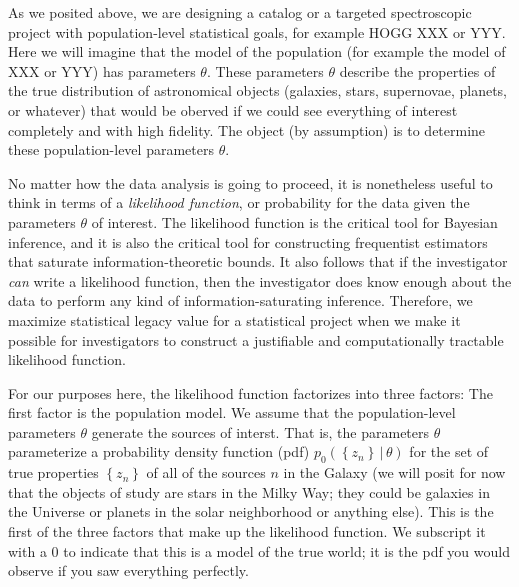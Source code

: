 \documentclass[modern]{aastex62}
\newcommand{\given}{\,|\,}
\newcommand{\set}[1]{\left\{{#1}\right\}}
\begin{document}
As we posited above, we are designing a catalog or a targeted
spectroscopic project
with population-level statistical goals, for example HOGG XXX or YYY.
Here we will imagine that the model of the population (for example the model
of XXX or YYY) has parameters $\theta$.
These parameters $\theta$ describe the properties of the true distribution
of astronomical objects (galaxies, stars, supernovae, planets, or whatever)
that would be oberved if we could see everything of interest completely and
with high fidelity.
The object (by assumption) is to determine these population-level parameters
$\theta$.

No matter how the data analysis is going to proceed, it is nonetheless
useful to think in
terms of a \emph{likelihood function}, or probability for the data given
the parameters $\theta$ of interest.
The likelihood function is the critical tool for Bayesian inference, and
it is also the critical tool for constructing frequentist estimators that
saturate information-theoretic bounds.
It also follows that if the investigator \emph{can} write a likelihood
function, then the investigator does know enough about the data to perform
any kind of information-saturating inference.
Therefore, we maximize statistical legacy value for a statistical project
when we make it possible for investigators to construct a justifiable and
computationally tractable likelihood function.

For our purposes here, the likelihood function factorizes into three
factors:
The first factor is the population model.
We assume that the population-level parameters $\theta$ generate the
sources of interst.
That is, the parameters $\theta$ parameterize a probability density
function (pdf) $p_0(\set{z_n}\given\theta)$
for the set of true properties $\set{z_n}$ of all of the sources $n$
in the Galaxy (we will posit for now that the objects of study are
stars in the Milky Way; they could be galaxies in the Universe or
planets in the solar neighborhood or anything else).
This is the first of the three factors that make up the likelihood
function.
We subscript it with a $0$ to indicate that
this is a model of the true world;
it is the pdf you would observe if you saw everything perfectly.
\end{document}
